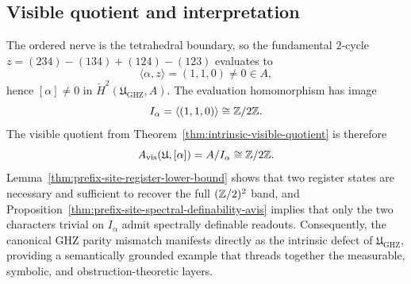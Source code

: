 \subsection{Visible quotient and interpretation}

The ordered nerve is the tetrahedral boundary, so the fundamental $2$-cycle
$z=(234)-(134)+(124)-(123)$ evaluates to
\[
\langle \alpha,z\rangle = (1,1,0)\neq 0\in A,
\]
hence $[\alpha]\neq 0$ in $\check{H}^2(\mathfrak{U}_{\mathrm{GHZ}},A)$.  The
evaluation homomorphism has image
\[
I_\alpha=\langle(1,1,0)\rangle\cong\mathbb{Z}/2\mathbb{Z}.
\]
The visible quotient from Theorem~\ref{thm:intrinsic-visible-quotient} is
therefore
\[
A_{\mathrm{vis}}(\mathfrak{U},[\alpha])=A/I_\alpha\cong\mathbb{Z}/2\mathbb{Z}.
\]
Lemma~\ref{thm:prefix-site-register-lower-bound} shows that two register states
are necessary and sufficient to recover the full $(\mathbb{Z}/2)^2$ band, and
Proposition~\ref{thm:prefix-site-spectral-definability-avis} implies that only
the two characters trivial on $I_\alpha$ admit spectrally definable
readouts.  Consequently, the canonical GHZ parity mismatch manifests directly as the intrinsic
defect of $\mathfrak{U}_{\mathrm{GHZ}}$, providing a semantically grounded
example that threads together the measurable, symbolic, and obstruction-theoretic
layers.

